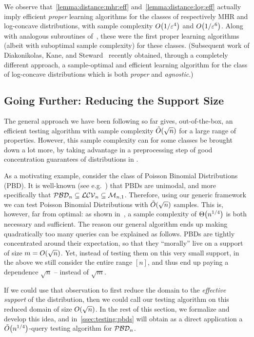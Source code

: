 We observe that~\cref{lemma:distance:mhr:eff} and~\cref{lemma:distance:log:eff} actually imply efficient \emph{proper} learning algorithms for the classes of respectively MHR and log-concave distributions, with sample complexity $\bigO{1/\eps^4}$ and $\bigO{1/\eps^6}$. Along with analogous subroutines of~\cite{ADK:15}, these were the first proper learning algorithms (albeit with suboptimal sample complexity) for these classes. (Subsequent work of Diakonikolas, Kane, and Steward~\cite{DKS:16} recently obtained, through a completely different approach, a sample-optimal and efficient learning algorithm for the class of log-concave distributions which is both \emph{proper} and \emph{agnostic}.)
 
\subsection{Going Further: Reducing the Support Size}\label{sec:effectivesupport}
  The general approach we have been following so far gives, out-of-the-box, an efficient testing algorithm with sample complexity $\tildeO{\sqrt{n}}$ for a large range of properties. However, this sample complexity can for some classes \property be brought down a lot more, by taking advantage in a preprocessing step of good concentration guarantees of distributions in \property.\medskip

\noindent As a motivating example, consider the class of Poisson Binomial Distributions (PBD). It is well-known (see e.g.~\cite[Section 2]{KG:71}) that PBDs are unimodal, and more specifically that $\classpbd[n]\subseteq\classlogconcave\subseteq\classuni$. Therefore, using our generic framework we can test Poisson Binomial Distributions with $\tildeO{\sqrt{n}}$ samples. This is, however, far from optimal: as shown in~\cite{AD:15}, a sample complexity of $\bigTheta{n^{1/4}}$ is both necessary and sufficient. The reason our general algorithm ends up making quadratically too many queries can be explained as follows. PBDs are tightly concentrated around their expectation, so that they ``morally'' live on a support of size $m=\bigO{\sqrt{n}}$. Yet, instead of testing them on this very small support, in the above we still consider the entire range $[n]$, and thus end up paying a dependence $\sqrt{n}$ -- instead of $\sqrt{m}$.

If we could use that observation to first reduce the domain to the \emph{effective support} of the distribution, then we could call our testing algorithm on this reduced domain of size $\bigO{\sqrt{n}}$. In the rest of this section, we formalize and develop this idea, and in~\cref{ssec:testing:pbds} will obtain as a direct application a $\tildeO{n^{1/4}}$-query testing algorithm for $\classpbd[n]$.

